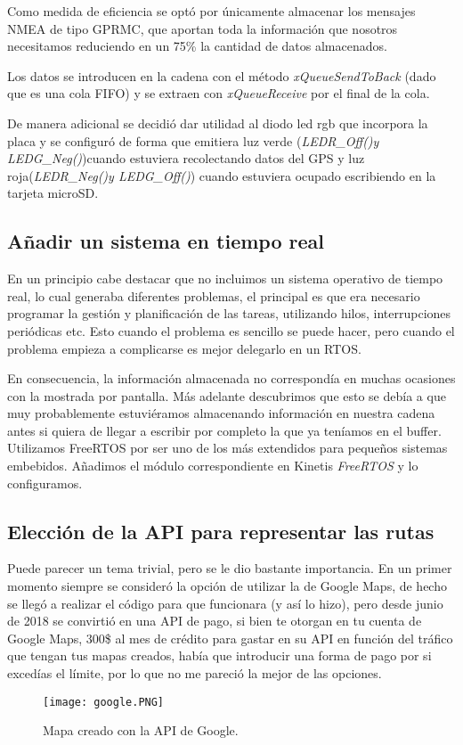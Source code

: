 Como medida de eficiencia se optó por únicamente almacenar los mensajes NMEA de tipo GPRMC, que aportan toda la información que nosotros necesitamos reduciendo en un 75\% la cantidad de datos almacenados.

Los datos se introducen en la cadena con el método \textit{xQueueSendToBack} (dado que es una cola FIFO) y se extraen con \textit{xQueueReceive} por el final de la cola. 

De manera adicional se decidió dar utilidad al diodo led rgb que incorpora la placa y se configuró de forma que emitiera luz verde (\textit{LEDR\_Off()y LEDG\_Neg()})cuando estuviera recolectando datos del GPS y luz roja(\textit{LEDR\_Neg()y LEDG\_Off()}) cuando estuviera ocupado escribiendo en la tarjeta microSD.

\subsection{Añadir un sistema en tiempo real}
En un principio cabe destacar que no incluimos un sistema operativo de tiempo real, lo cual generaba diferentes problemas, el principal es que era necesario programar la gestión y planificación de las tareas, utilizando hilos, interrupciones periódicas etc. Esto cuando el problema es sencillo se puede hacer, pero cuando el problema empieza a complicarse es mejor delegarlo en un RTOS. 

En consecuencia, la información almacenada no correspondía en muchas ocasiones con la mostrada por pantalla. 
Más adelante descubrimos que esto se debía a que muy probablemente estuviéramos almacenando información en nuestra cadena antes si quiera de llegar a escribir por completo la que ya teníamos en el buffer. Utilizamos FreeRTOS por ser uno de los más extendidos para pequeños sistemas embebidos. Añadimos el módulo correspondiente en Kinetis \textit{FreeRTOS} y lo configuramos.

\subsection{Elección de la API para representar las rutas}
Puede parecer un tema trivial, pero se le dio bastante importancia. En un primer momento siempre se consideró la opción de utilizar la de Google Maps, de hecho se llegó a realizar el código para que funcionara (y así lo hizo), pero desde junio de 2018 se convirtió en una API de pago, si bien te otorgan en tu cuenta de Google Maps, 300\$ al mes de crédito para gastar en su API en función del tráfico que tengan tus mapas creados, había que introducir una forma de pago por si excedías el límite, por lo que no me pareció la mejor de las opciones.
\begin{figure}[!h]
	\centering
	\texttt{[image: google.PNG]}
	\caption{Mapa creado con la API de Google.}\label{fig:google.PNG}
\end{figure}
\FloatBarrier


